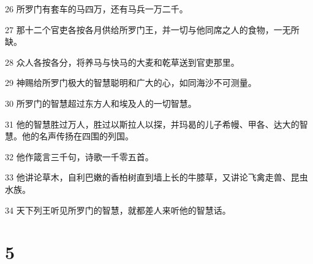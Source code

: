 \par 26 所罗门有套车的马四万，还有马兵一万二千。
\par 27 那十二个官吏各按各月供给所罗门王，并一切与他同席之人的食物，一无所缺。
\par 28 众人各按各分，将养马与快马的大麦和乾草送到官吏那里。
\par 29 神赐给所罗门极大的智慧聪明和广大的心，如同海沙不可测量。
\par 30 所罗门的智慧超过东方人和埃及人的一切智慧。
\par 31 他的智慧胜过万人，胜过以斯拉人以探，并玛曷的儿子希幔、甲各、达大的智慧。他的名声传扬在四围的列国。
\par 32 他作箴言三千句，诗歌一千零五首。
\par 33 他讲论草木，自利巴嫩的香柏树直到墙上长的牛膝草，又讲论飞禽走兽、昆虫水族。
\par 34 天下列王听见所罗门的智慧，就都差人来听他的智慧话。

\chapter{5}


